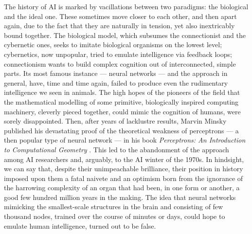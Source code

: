 The history of AI is marked by vacillations between two paradigms: the biological and the ideal one. These sometimes move closer to each other, and then apart again, due to the fact that they are naturally in tension, yet also inextricably bound together. The biological model, which subsumes the connectionist and the cybernetic ones, seeks to imitate biological organisms on the lowest level; cybernetics, now unpopular, tried to emulate intelligence via feedback loops; connectionism wants to  build complex cognition out of interconnected, simple parts. Its most famous instance --- neural networks --- and the approach in general, have, time and time again, failed to produce even the rudimentary intelligence we seen in animals. The high hopes of the pioneers of the field that the mathematical modelling of some primitive, biologically inspired computing machinery, cleverly pieced together, could mimic the cognition of humans, were sorely disappointed. Then, after years of lacklustre results, Marvin Minsky published his devastating proof of the theoretical weakness of perceptrons --- a then popular type of neural network --- in his book {\em Perceptrons: An Introduction to Computational Geometry} \cite{Minsky1988}. This led to the abandonment of the approach among AI researchers and, arguably, to the AI winter of the 1970s. In hindsight, we can say that, despite their unimpeachable brilliance, their position in history imposed upon them a fatal naivete and an optimism born from the ignorance of the harrowing complexity of an organ that had been, in one form or another, a good few hundred million years in the making. The idea that neural networks mimicking the smallest-scale structures in the brain and consisting of few thousand nodes, trained over the course of minutes or days, could hope to emulate human intelligence, turned out to be false.

